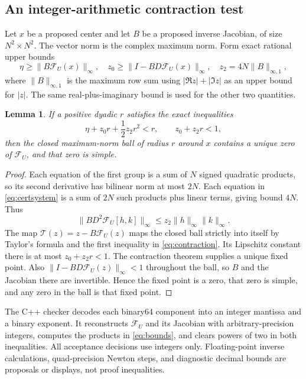\documentclass[11pt]{article}
\newtheorem{lemma}[theorem]{Lemma}
\theoremstyle{remark}\newtheorem{remark}[theorem]{Remark}
\begin{document}
\subsection{An integer-arithmetic contraction test}
Let $x$ be a proposed center and let $B$ be a proposed inverse Jacobian, of size $N^2\times N^2$. The vector norm is the complex maximum norm. Form exact rational upper bounds
\begin{equation}\label{eq:bounds}
\eta\ge\|B\mathcal F_U(x)\|_\infty,\quad
z_0\ge\|I-BD\mathcal F_U(x)\|_\infty,\quad
z_2=4N\|B\|_{\infty,1},
\end{equation}
where $\|B\|_{\infty,1}$ is the maximum row sum using $|\Re z|+|\Im z|$ as an upper bound for $|z|$. The same real-plus-imaginary bound is used for the other two quantities.

\begin{lemma}\label{lem:cert}
If a positive dyadic $r$ satisfies the exact inequalities
\begin{equation}\label{eq:contraction}
\eta+z_0r+\frac12z_2r^2<r,\qquad z_0+z_2r<1,
\end{equation}
then the closed maximum-norm ball of radius $r$ around $x$ contains a unique zero of $\mathcal F_U$, and that zero is simple.
\end{lemma}
\begin{proof}
Each equation of the first group is a sum of $N$ signed quadratic products, so its second derivative has bilinear norm at most $2N$. Each equation in \eqref{eq:certsystem} is a sum of $2N$ such products plus linear terms, giving bound $4N$. Thus
\[
\|BD^2\mathcal F_U[h,k]\|_\infty\le z_2\|h\|_\infty\|k\|_\infty.
\]
The map $\mathcal T(z)=z-B\mathcal F_U(z)$ maps the closed ball strictly into itself by Taylor's formula and the first inequality in \eqref{eq:contraction}. Its Lipschitz constant there is at most $z_0+z_2r<1$. The contraction theorem supplies a unique fixed point. Also $\|I-BD\mathcal F_U(z)\|_\infty<1$ throughout the ball, so $B$ and the Jacobian there are invertible. Hence the fixed point is a zero, that zero is simple, and any zero in the ball is that fixed point.
\end{proof}

The C++ checker decodes each binary64 component into an integer mantissa and a binary exponent. It reconstructs $\mathcal F_U$ and its Jacobian with arbitrary-precision integers, computes the products in \eqref{eq:bounds}, and clears powers of two in both inequalities. All acceptance decisions use integers only. Floating-point inverse calculations, quad-precision Newton steps, and diagnostic decimal bounds are proposals or displays, not proof inequalities.
\end{document}
